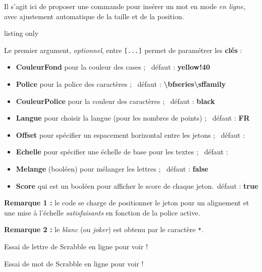 \documentclass{article}
\newcommand\Cle[1]{{\bfseries\sffamily\textlangle #1\textrangle}}
\begin{document}
Il s'agit ici de proposer une commande pour insérer un mot en mode \textit{en ligne}, avec ajustement automatique de la taille et de la position.

\begin{PresentationCode}{listing only}
\end{PresentationCode}

Le premier argument, \textit{optionnel}, entre \texttt{[...]} permet de paramétrer les \Cle{clés} :

\begin{itemize}
	\item \Cle{CouleurFond} pour la couleur des cases ; \hfill~défaut : \Cle{yellow!40}
	\item \Cle{Police} pour la police des caractères ; \hfill~défaut : \Cle{\textbackslash bfseries\textbackslash sffamily}
	\item \Cle{CouleurPolice} pour la couleur des caractères ; \hfill~défaut : \Cle{black}
	\item \Cle{Langue} pour choisir la langue (pour les nombres de points) ; \hfill~défaut : \Cle{FR}
	\item \Cle{Offset} pour spécifier un espacement horizontal entre les jetons ; \hfill~défaut : \Cle{0.1pt}
	\item \Cle{Echelle} pour spécifier une échelle de base pour les textes ; \hfill~défaut : \Cle{0.6}
	\item \Cle{Melange} (booléen) pour mélanger les lettres ; \hfill~défaut : \Cle{false}
	\item \Cle{Score} qui est un booléen pour afficher le score de chaque jeton.\hfill~défaut : \Cle{true}
\end{itemize}

\textbf{Remarque 1 :} le code se charge de positionner le jeton pour un alignement et une mise à l'échelle \textit{satisfaisants} en fonction de la police active.

\smallskip

\textbf{Remarque 2 :} le \textit{blanc} (ou \textit{joker}) est obtenu par le caractère \texttt{*}.

\begin{PresentationCode}{}
Essai de lettre de Scrabble en ligne  pour voir !
\end{PresentationCode}

\begin{PresentationCode}{}
Essai de mot de Scrabble en ligne  pour voir !
\end{PresentationCode}
\end{document}
